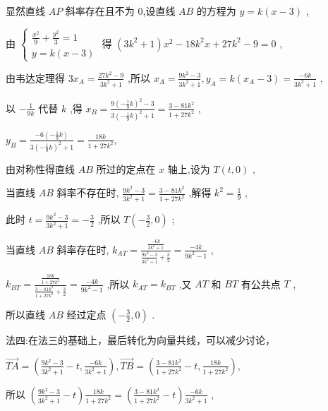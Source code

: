 \documentclass[10pt]{article}
\begin{document}
显然直线 \({AP}\) 斜率存在且不为 0,设直线 \({AB}\) 的方程为 \(y = k\left( {x - 3}\right)\) ,

由 \(\left\{  \begin{array}{l} \frac{{x}^{2}}{9} + \frac{{y}^{2}}{3} = 1 \\  y = k\left( {x - 3}\right)  \end{array}\right.\) 得 \(\left( {3{k}^{2} + 1}\right) {x}^{2} - {18}{k}^{2}x + {27}{k}^{2} - 9 = 0\) ,

由韦达定理得 \(3{x}_{A} = \frac{{27}{k}^{2} - 9}{3{k}^{2} + 1}\) ,所以 \({x}_{A} = \frac{9{k}^{2} - 3}{3{k}^{2} + 1},{y}_{A} = k\left( {{x}_{A} - 3}\right)  = \frac{-{6k}}{3{k}^{2} + 1}\) ,

以 \(- \frac{1}{9k}\) 代替 \(k\) ,得 \({x}_{B} = \frac{9{\left( -\frac{1}{9}k\right) }^{2} - 3}{3{\left( -\frac{1}{9}k\right) }^{2} + 1} = \frac{3 - {81}{k}^{2}}{1 + {27}{k}^{2}}\) ,

\({y}_{B} = \frac{-6\left( {-\frac{1}{9}k}\right) }{3{\left( -\frac{1}{9}k\right) }^{2} + 1} = \frac{18k}{1 + {27}{k}^{2}},\)

由对称性得直线 \({AB}\) 所过的定点在 \(x\) 轴上,设为 \(T\left( {t,0}\right)\) ,

当直线 \({AB}\) 斜率不存在时, \(\frac{9{k}^{2} - 3}{3{k}^{2} + 1} = \frac{3 - {81}{k}^{2}}{1 + {27}{k}^{2}}\) ,解得 \({k}^{2} = \frac{1}{9}\) ,

此时 \(t = \frac{9{k}^{2} - 3}{3{k}^{2} + 1} =  - \frac{3}{2}\) ,所以 \(T\left( {-\frac{3}{2},0}\right)\) ;

当直线 \({AB}\) 斜率存在时, \({k}_{AT} = \frac{\frac{-{6k}}{3{k}^{2} + 1}}{\frac{9{k}^{2} - 3}{3{k}^{2} + 1} + \frac{3}{2}} = \frac{-{4k}}{9{k}^{2} - 1}\) ,

\({k}_{BT} = \frac{\frac{18k}{1 + {27}{k}^{2}}}{\frac{3 - {81}{k}^{2}}{1 + {27}{k}^{2}} + \frac{3}{2}} = \frac{-{4k}}{9{k}^{2} - 1}\) ,所以 \({k}_{AT} = {k}_{BT}\) ,又 \({AT}\) 和 \({BT}\) 有公共点 \(T\) ,

所以直线 \({AB}\) 经过定点 \(\left( {-\frac{3}{2},0}\right)\) .

法四:在法三的基础上，最后转化为向量共线，可以减少讨论，

\(\overrightarrow{TA} = \left( {\frac{9{k}^{2} - 3}{3{k}^{2} + 1} - t,\frac{-{6k}}{3{k}^{2} + 1}}\right) ,\overrightarrow{TB} = \left( {\frac{3 - {81}{k}^{2}}{1 + {27}{k}^{2}} - t,\frac{18k}{1 + {27}{k}^{2}}}\right) ,\)

所以 \(\left( {\frac{9{k}^{2} - 3}{3{k}^{2} + 1} - t}\right) \frac{18k}{1 + {27}{k}^{2}} = \left( {\frac{3 - {81}{k}^{2}}{1 + {27}{k}^{2}} - t}\right) \frac{-{6k}}{3{k}^{2} + 1}\) ,
\end{document}
